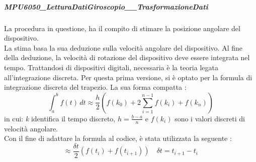 \documentclass[11pt]{report}
\begin{document}
\subparagraph{MPU6050\_LetturaDatiGiroscopio\_\_TrasformazioneDati}
La procedura in questione, ha il compito di stimare la posizione angolare del dispositivo.\\
La stima basa la sua deduzione sulla velocità angolare del dispositivo. 
Al fine della deduzione, la velocità di rotazione del dispositivo deve essere integrata nel tempo.
Trattandosi di dispositivi digitali, necessaria è la teoria legata all'integrazione discreta.
Per questa prima versione, si è optato per la formula di integrazione discreta del trapezio. La sua forma compatta :
\begin{equation}
    \int_{a}^{b} f(t)\, dt \approx \frac{h}{2} \left( f(k_0) + 2 \sum_{i=1}^{n-1} f(k_i) + f(k_n) \right)
\end{equation}
in cui: \textit{k} identifica il tempo discreto, $h=\frac{b-a}{n}$ e $f(k_i)$ sono i valori discreti di velocità angolare.\\
Con il fine di adattare la formula al codice, è stata utilizzata la seguente :
\begin{equation}
    \approx \frac{\delta t}{2} \left(f(t_i)+f(t_{i+1})\right)  \quad \delta t = t_{i+1} - t_i
\end{equation} 
\end{document}
